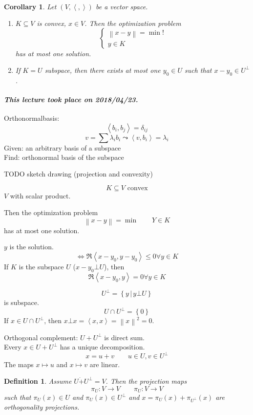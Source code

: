 \documentclass{article}
\newtheorem{definition}{Definition}  \numberwithin{definition}{section}
\newtheorem*{corollary}{Corollary}%
\newcommand{\set}[1]{\left\{#1\right\}}
\newcommand{\setdef}[2]{\left\{\left.#1\,\right|\,#2\right\}}
\newcommand{\ip}[2]{\left\langle#1,#2\right\rangle} %
\newcommand{\angel}[1]{\left\langle#1\right\rangle}
\newcommand{\norm}[1]{\left\|#1\right\|}
\newcommand{\dateref}[1]{\paragraph{\textit{This lecture took place on #1.}}}
\begin{document}
\begin{corollary}
  Let $(V, \angel{,})$ be a vector space.
  \begin{enumerate}
    \item $K \subseteq V$ is convex, $x \in V$.
      Then the optimization problem
      \[
        \left\{\begin{array}{c}
          \norm{x - y} = \min! \\
          y \in K
        \end{array}\right.
      \]
      has at most one solution.
    \item If $K = U$ subspace,
      then there exists at most one $y_0 \in U$ such that $x - y_0 \in U^\bot$.
  \end{enumerate}
\end{corollary}

\dateref{2018/04/23}

Orthonormalbasis:
\[ \ip{b_i}{b_j} = \delta_{ij} \]
\[ v = \sum \lambda_i b_i \leadsto \ip{v}{b_i} = \lambda_i \]
Given: an arbitrary basis of a subspace \\
Find: orthonormal basis of the subspace

TODO sketch drawing (projection and convexity)

\[ K \subseteq V \text{ convex} \]
$V$ with scalar product.

Then the optimization problem
\[ \norm{x - y} = \min \qquad Y \in K \]
has at most one solution.

$y$ is the solution.
\[ \iff \Re\ip{x-y_0}{y - y_0} \leq 0 \forall y \in K \]
If $K$ is the subspace $U$ ($x - y_0 \bot U$), then
\[ \Re\ip{x - y_0}{y} = 0 \forall y \in K \]

\[ U^\bot = \setdef{y}{y \bot U} \]
is subspace.
\[ U \cap U^\bot = \set{0} \]
If $x \in U \cap U^\bot$, then $x \bot x = \ip{x}{x} = \norm{x}^2 = 0$.

Orthogonal complement: $U + U^\bot$ is direct sum. \\
Every $x \in U + U^\bot$ has a unique decomposition.
\[ x = u + v \qquad u \in U, v \in U^\bot \]
The maps $x \mapsto u$ and $x \mapsto v$ are linear.

\begin{definition}
  Assume $U \dot+ U^\bot = V$.
  Then the projection maps
  \[ \pi_U: V \to V \qquad \pi_U: V \to V \]
  such that $\pi_U(x) \in U$ and $\pi_U(x) \in U^\bot$ and $x = \pi_U(x) + \pi_{U^\bot}(x)$ are orthogonality projections.
\end{definition}
\end{document}
